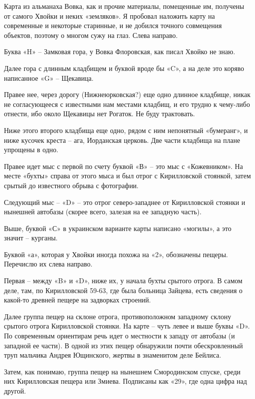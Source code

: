 
Карта из альманаха Вовка, как и прочие материалы, помещенные им, получены от самого Хвойки и неких «земляков». Я пробовал наложить карту на современные и некоторые старинные, и не добился точного совмещения объектов, поэтому о многом сужу на глаз. Слева направо.

Буква «H» – Замковая гора, у Вовка Флоровская, как писал Хвойко не знаю.

Далее гора с длинным кладбищем и буквой вроде бы «C», а на деле это коряво написанное «G» – Щекавица.

Правее нее, через дорогу (Нижнеюрковская?) еще одно длинное кладбище, никак не согласующееся с известными нам местами кладбищ, и его трудно к чему-либо отнести, ибо около Щекавицы нет Рогаток. Не буду трактовать. 

Ниже этого второго кладбища еще одно, рядом с ним непонятный «бумеранг», и ниже кусочек креста – ага, Иорданская церковь. Две части кладбища на плане упрощены в одно.

Правее идет мыс с первой по счету буквой «В» – это мыс с «Кожевником». На месте «бухты» справа от этого мыса и был отрог с Кирилловской стоянкой, затем срытый до известного обрыва с фотографии.

Следующий мыс – «D» – это отрог северо-западнее от Кирилловской стоянки и нынешней автобазы (скорее всего, залезая на ее западную часть).

Выше, буквой «С» в украинском варианте карты написано «могилы», а это значит – курганы. 

Буквой «а», которая у Хвойки иногда похожа на «2», обозначены пещеры. Перечислю их слева направо.

Первая – между «B» и «D», ниже их, у начала бухты срытого отрога. В самом деле, там, по Кирилловской 59-63, где была больница Зайцева, есть сведения о какой-то древней пещере на задворках строений.

Далее группа пещер на склоне отрога, противоположном западному склону срытого отрога Кирилловской стоянки. На карте – чуть левее и выше буквы «D». По современным ориентирам речь идет о местности к западу от автобазы (и западной ее части). В одной из этих пещер обнаружили почти обескровленный труп мальчика Андрея Ющинского, жертвы в знаменитом деле Бейлиса.

Затем, как понимаю, группа пещер на нынешнем Смородинском спуске, среди них Кирилловская пещера или Змиева. Подписаны как «29», где одна цифра над другой.

